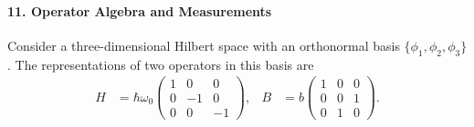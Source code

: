 \documentclass[11pt,a4paper]{scrartcl}
\begin{document}
\paragraph{11. Operator Algebra and Measurements}
Consider a three-dimensional Hilbert space with an orthonormal basis $\{\phi_1,\phi_2,\phi_3\}$. The representations of two operators in this basis are
\begin{align*}
    H &= \hbar \omega_0
    \begin{pmatrix}
        1 & 0 & 0 \\
        0 & -1 & 0 \\
        0 & 0 & -1
    \end{pmatrix},
    &
    B &= b
    \begin{pmatrix}
        1 & 0 & 0 \\
        0 & 0 & 1 \\
        0 & 1 & 0
    \end{pmatrix}.
\end{align*}
\end{document}
